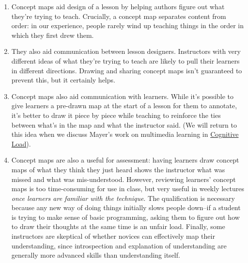 \documentclass[10pt,statementpaper]{memoir}
\begin{document}
\begin{enumerate}
\def\labelenumi{\arabic{enumi}.}
\item
  Concept maps aid design of a lesson by helping authors figure out what
  they're trying to teach. Crucially, a concept map separates content
  from order: in our experience, people rarely wind up teaching things
  in the order in which they first drew them.
\item
  They also aid communication between lesson designers. Instructors with
  very different ideas of what they're trying to teach are likely to
  pull their learners in different directions. Drawing and sharing
  concept maps isn't guaranteed to prevent this, but it certainly helps.
\item
  Concept maps also aid communication with learners. While it's possible
  to give learners a pre-drawn map at the start of a lesson for them to
  annotate, it's better to draw it piece by piece while teaching to
  reinforce the ties between what's in the map and what the instructor
  said. (We will return to this idea when we discuss Mayer's work on
  multimedia learning in \href{load.html}{Cognitive Load}).
\item
  Concept maps are also a useful for assessment: having learners draw
  concept maps of what they think they just heard shows the instructor
  what was missed and what was mis-understood. However, reviewing
  learners' concept maps is too time-consuming for use in class, but
  very useful in weekly lectures \emph{once learners are familiar with
  the technique}. The qualification is necessary because any new way of
  doing things initially slows people down--if a student is trying to
  make sense of basic programming, asking them to figure out how to draw
  their thoughts at the same time is an unfair load. Finally, some
  instructors are skeptical of whether novices can effectively map their
  understanding, since introspection and explanation of understanding
  are generally more advanced skills than understanding itself.
\end{enumerate}
\end{document}
